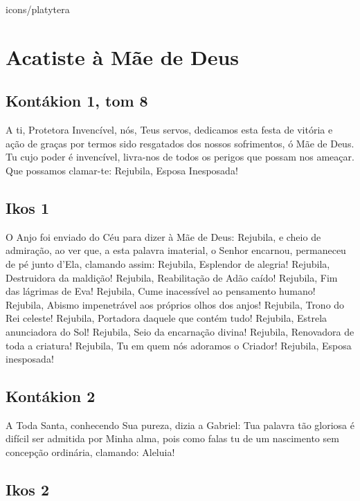 \documentclass{subfiles}
\begin{document}
\begin{chapterimg}[width=\textwidth]{icons/platytera}
    \chapter{Acatiste à Mãe de Deus}
\end{chapterimg}

\section*{Kontákion 1, tom 8}

A ti, Protetora Invencível, nós, Teus servos, dedicamos esta festa de
vitória e ação de graças por termos sido resgatados dos nossos sofrimentos, ó
Mãe de Deus. Tu cujo poder é invencível, livra-nos de todos os perigos que
possam nos ameaçar. Que possamos clamar-te: Rejubila, Esposa Inesposada!

\section*{Ikos 1}

O Anjo foi enviado do Céu para dizer à Mãe de Deus: Rejubila, e cheio
de admiração, ao ver que, a esta palavra imaterial, o Senhor encarnou,
permaneceu de pé junto d'Ela, clamando assim:
Rejubila, Esplendor de alegria!
Rejubila, Destruidora da maldição!
Rejubila, Reabilitação de Adão caído!
Rejubila, Fim das lágrimas de Eva!
Rejubila, Cume inacessível ao pensamento humano!
Rejubila, Abismo impenetrável aos próprios olhos dos anjos!
Rejubila, Trono do Rei celeste!
Rejubila, Portadora daquele que contém tudo!
Rejubila, Estrela anunciadora do Sol!
Rejubila, Seio da encarnação divina!
Rejubila, Renovadora de toda a criatura!
Rejubila, Tu em quem nós adoramos o Criador!
Rejubila, Esposa inesposada!


\section*{Kontákion 2}

A Toda Santa, conhecendo Sua pureza, dizia a Gabriel: Tua palavra tão
gloriosa é difícil ser admitida por Minha alma, pois como falas tu de um
nascimento sem concepção ordinária, clamando: Aleluia!

\section*{Ikos 2}
\end{document}
